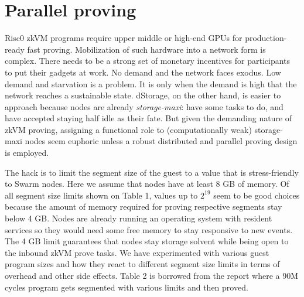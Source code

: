 \documentclass[a4paper, 10pt]{article}
\begin{document}
\section{Parallel proving}
Risc0 zkVM programs require upper middle or high-end GPUs for production-ready fast proving. Mobilization of such hardware into a network form is complex. There needs to be a strong set of monetary incentives for participants to put their gadgets at work. No demand and the network faces exodus. Low demand and starvation is a problem. It is only when the demand is high that the network reaches a sustainable state. dStorage, on the other hand, is easier to approach because nodes are already \textit{storage-maxi}: have some tasks to do, and have accepted staying half idle as their fate. But given the demanding nature of zkVM proving, assigning a functional role to (computationally weak) storage-maxi nodes seem euphoric unless a robust distributed and parallel proving design is employed.
\par
The hack is to limit the segment size of the guest to a value that is stress-friendly to Swarm nodes. Here we assume that nodes have at least 8 GB of memory. Of all segment size limits shown on Table 1, values up to $2^{19}$ seem to be good choices because the amount of memory required for proving respective segments stay below 4 GB. Nodes are already running an operating system with resident services so they would need some free memory to stay responsive to new events. The 4 GB limit guarantees that nodes stay storage solvent while being open to the inbound zkVM prove tasks. We have experimented with various guest program sizes and how they react to different segment size limits in terms of overhead and other side effects\cite{segmentation:2024}. Table 2 is borrowed from the report where a 90M cycles program gets segmented with various limits and then proved.
\end{document}
